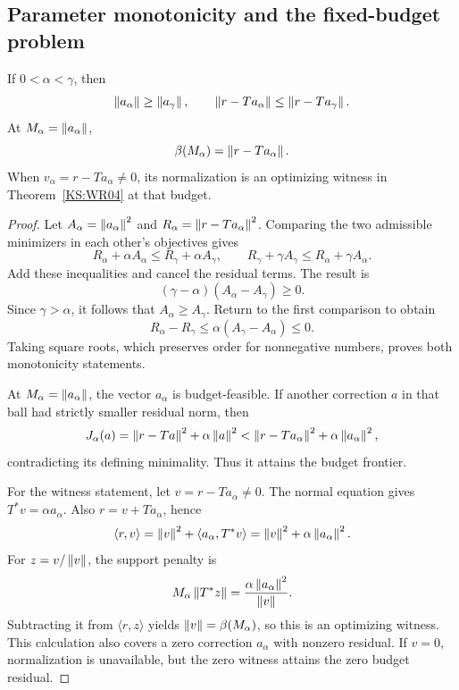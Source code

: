 \subsection{Parameter monotonicity and the fixed-budget problem}
\begin{KSproposition}\label{KS:WR07}
If $0<\alpha<\gamma$, then
\[
 \left\lVert a_\alpha\right\rVert\ge\left\lVert a_\gamma\right\rVert,\qquad
 \left\lVert r-Ta_\alpha\right\rVert\le\left\lVert r-Ta_\gamma\right\rVert.
\]
At $M_\alpha=\left\lVert a_\alpha\right\rVert$,
\[
 \beta(M_\alpha)=\left\lVert r-Ta_\alpha\right\rVert.
\]
When $v_\alpha=r-Ta_\alpha\ne0$, its normalization is an optimizing witness in Theorem~\ref{KS:WR04} at that budget.
\end{KSproposition}
\begin{proof}
Let $A_\alpha=\left\lVert a_\alpha\right\rVert^2$ and $R_\alpha=\left\lVert r-Ta_\alpha\right\rVert^2$. Comparing the two admissible minimizers in each other's objectives gives
\[
 R_\alpha+\alpha A_\alpha\le R_\gamma+\alpha A_\gamma,
 \qquad R_\gamma+\gamma A_\gamma\le R_\alpha+\gamma A_\alpha.
\]
Add these inequalities and cancel the residual terms. The result is
\[
 (\gamma-\alpha)(A_\alpha-A_\gamma)\ge0.
\]
Since $\gamma>\alpha$, it follows that $A_\alpha\ge A_\gamma$. Return to the first comparison to obtain
\[
 R_\alpha-R_\gamma\le\alpha(A_\gamma-A_\alpha)\le0.
\]
Taking square roots, which preserves order for nonnegative numbers, proves both monotonicity statements.

At $M_\alpha=\left\lVert a_\alpha\right\rVert$, the vector $a_\alpha$ is budget-feasible. If another correction $a$ in that ball had strictly smaller residual norm, then
\[
 J_\alpha(a)
 =\left\lVert r-Ta\right\rVert^2+\alpha\left\lVert a\right\rVert^2
 <\left\lVert r-Ta_\alpha\right\rVert^2+\alpha\left\lVert a_\alpha\right\rVert^2,
\]
contradicting its defining minimality. Thus it attains the budget frontier.

For the witness statement, let $v=r-Ta_\alpha\ne0$. The normal equation gives $T^*v=\alpha a_\alpha$. Also $r=v+Ta_\alpha$, hence
\[
 \langle r,v\rangle
 =\left\lVert v\right\rVert^2+\langle a_\alpha,T^*v\rangle
 =\left\lVert v\right\rVert^2+\alpha\left\lVert a_\alpha\right\rVert^2.
\]
For $z=v/\left\lVert v\right\rVert$, the support penalty is
\[
 M_\alpha\left\lVert T^*z\right\rVert
 =\frac{\alpha\left\lVert a_\alpha\right\rVert^2}{\left\lVert v\right\rVert}.
\]
Subtracting it from $\langle r,z\rangle$ yields $\left\lVert v\right\rVert=\beta(M_\alpha)$, so this is an optimizing witness. This calculation also covers a zero correction $a_\alpha$ with nonzero residual. If $v=0$, normalization is unavailable, but the zero witness attains the zero budget residual.
\end{proof}

